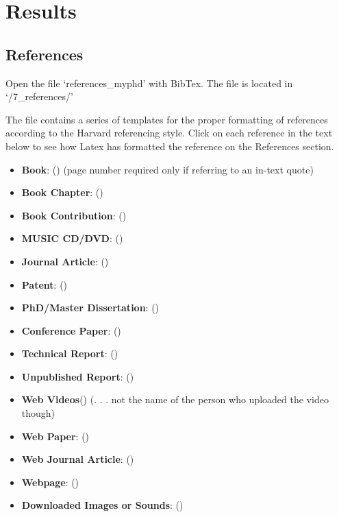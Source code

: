 


\chapter{Results} %

\ifpdf
    \graphicspath{{5_chapter5/figures/PNG/}{5_chapter5/figures/PDF/}{5_chapter5/figures/}}
\else
    \graphicspath{{5_chapter5/figures/EPS/}{5_chapter5/figures/}}
\fi




\section{References}

Open the file `references\_myphd' with BibTex. The file is located in `/7\_references/'

The file contains a series of templates for the proper formatting of references according to the Harvard referencing style.
Click on each reference in the text below to see how Latex has formatted the reference on the References section.

\begin{itemize}
\item \textbf{Book}: () (page number required only if referring to an in-text quote)
\item \textbf{Book Chapter}: ()
\item \textbf{Book Contribution}: ()
\item \textbf{MUSIC CD/DVD}: ()
\item \textbf{Journal Article}: ()
\item \textbf{Patent}: ()
\item \textbf{PhD/Master Dissertation}: ()
\item \textbf{Conference Paper}: ()
\item \textbf{Technical Report}: ()
\item \textbf{Unpublished Report}: ()
\item \textbf{Web Videos}() (. . . not the name of the person who uploaded the video though)
\item \textbf{Web Paper}: () 
\item \textbf{Web Journal Article}: ()
\item \textbf{Webpage}: ()
\item \textbf{Downloaded Images or Sounds}: ()
\end{itemize}


